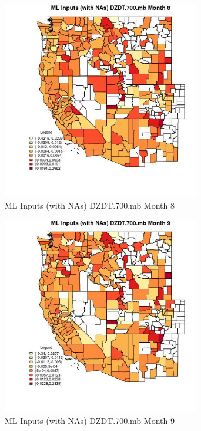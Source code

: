 \begin{figure} 
\centering  
\includegraphics[width=0.77\textwidth]{Code_Outputs/Report_ML_input_PM25_Step4_part_f_de_duplicated_aveswNAs_CountyDZDT700mbmedianMonth8.jpg} 
\caption{\label{fig:Report_ML_input_PM25_Step4_part_f_de_duplicated_aveswNAsCountyDZDT700mbmedianMonth8}ML Inputs (with NAs) DZDT.700.mb Month 8} 
\end{figure} 
 

\begin{figure} 
\centering  
\includegraphics[width=0.77\textwidth]{Code_Outputs/Report_ML_input_PM25_Step4_part_f_de_duplicated_aveswNAs_CountyDZDT700mbmedianMonth9.jpg} 
\caption{\label{fig:Report_ML_input_PM25_Step4_part_f_de_duplicated_aveswNAsCountyDZDT700mbmedianMonth9}ML Inputs (with NAs) DZDT.700.mb Month 9} 
\end{figure} 
 

